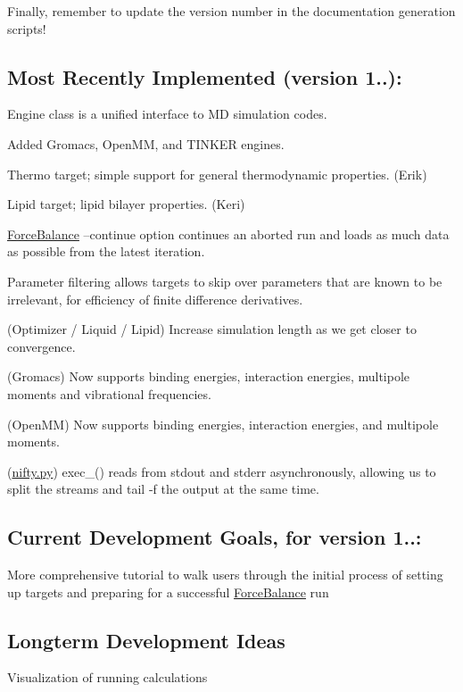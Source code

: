 Finally, remember to update the version number in the documentation generation scripts!\hypertarget{roadmap_recent}{}\subsection{Most Recently Implemented (version 1..)\+:}\label{roadmap_recent}
\begin{DoxyItemize}
\item Engine class is a unified interface to MD simulation codes. \item Added Gromacs, Open\+MM, and T\+I\+N\+K\+ER engines. \item Thermo target; simple support for general thermodynamic properties. (Erik) \item Lipid target; lipid bilayer properties. (Keri) \item \hyperlink{namespaceForceBalance}{Force\+Balance} --continue option continues an aborted run and loads as much data as possible from the latest iteration. \item Parameter filtering allows targets to skip over parameters that are known to be irrelevant, for efficiency of finite difference derivatives. \item (Optimizer / Liquid / Lipid) Increase simulation length as we get closer to convergence. \item (Gromacs) Now supports binding energies, interaction energies, multipole moments and vibrational frequencies. \item (Open\+MM) Now supports binding energies, interaction energies, and multipole moments. \item (\hyperlink{nifty_8py}{nifty.\+py}) exec\+\_\+() reads from stdout and stderr asynchronously, allowing us to split the streams and tail -\/f the output at the same time.\end{DoxyItemize}
\hypertarget{roadmap_current}{}\subsection{Current Development Goals, for version 1..\+:}\label{roadmap_current}
\begin{DoxyItemize}
\item More comprehensive tutorial to walk users through the initial process of setting up targets and preparing for a successful \hyperlink{namespaceForceBalance}{Force\+Balance} run\end{DoxyItemize}
\hypertarget{roadmap_longterm}{}\subsection{Longterm Development Ideas}\label{roadmap_longterm}
\begin{DoxyItemize}
\item Visualization of running calculations \end{DoxyItemize}
